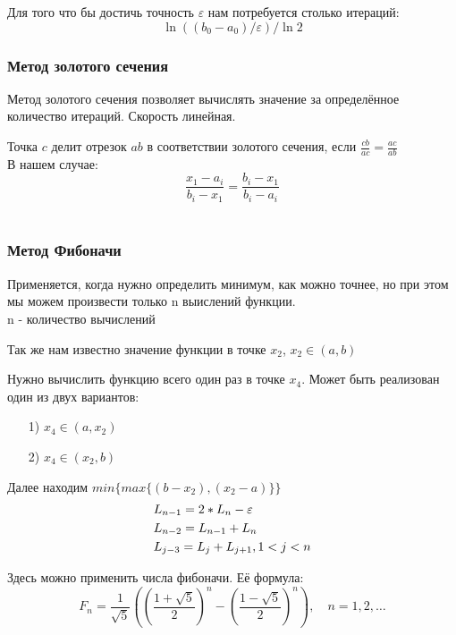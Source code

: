 \documentclass[fleqn]{article}
\begin{document}
Для того что бы достичь точность $\varepsilon$ нам потребуется столько итераций:
$$\ln{((b_0-a_0)/\varepsilon)/\ln{2}}$$

\subsubsection{Метод золотого сечения}

Метод золотого сечения позволяет вычислять значение за определённое количество итераций. Скорость линейная.

Точка $c$ делит отрезок $ab$ в соответствии золотого сечения, если $\frac{cb}{ac}=\frac{ac}{ab}$\\

В нашем случае:\\
$$\frac{x_1-a_i}{b_i-x_1}=\frac{b_i-x_1}{b_i-a_i}$$\\

\subsubsection{Метод Фибоначи}

Применяется, когда нужно определить минимум, как можно точнее, но при этом мы можем произвести только n выислений функции.\\

n - количество вычислений

Так же нам известно значение функции в точке $x_2$, $x_2\in (a,b)$

Нужно вычислить функцию всего один раз в точке $x_4$. Может быть реализован один из двух вариантов:

\begin{itemize}
    \item [1)] $x_4\in (a,x_2)$
    \item [2)] $x_4\in (x_2,b)$
\end{itemize}

Далее находим $min\{max\{(b-x_2), (x_2-a)\}\}$\\

\begin{align*}
    &L_{n-1}=2*L_n-\varepsilon\\
    &L_{n-2}=L_{n-1}+L_n\\
    &L_{j-3}=L_j+L_{j+1},\space 1<j<n
\end{align*}

Здесь можно применить числа фибоначи. Её формула:
$$F_n = \frac{1}{\sqrt{5}}((\frac{1+\sqrt{5}}{2})^n-(\frac{1-\sqrt{5}}{2})^n),\quad n=1,2,\dots$$\\
\end{document}
